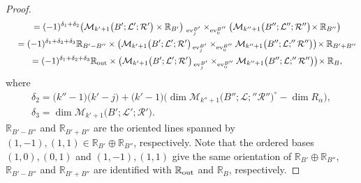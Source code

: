 \documentclass[pdftex]{sigma}
\numberwithin{equation}{section}
\theoremstyle{definition}
\begin{document}
\begin{proof}
\begin{gather}
\quad{} =  (-1)^{\delta_1 + \delta_2} \bigl( {\mathcal M}_{k'+1}\bigl(B';{\mathcal L}';{\mathcal R}'\bigr) \times {\mathbb R}_{B'} \bigr)
~_{{\rm ev}_j^{B'}} \times_{{\rm ev}_0^{B''}}
\bigl( {\mathcal M}_{k''+1}\bigl(B'';{\mathcal L}'';{\mathcal R}''\bigr)\! \times {\mathbb R}_{B''} \bigr) \nonumber \\
\quad{} =  (-1)^{\delta_1 + \delta_2 + \delta_3} {\mathbb R}_{B'-B''} \times \bigl( {\mathcal M}_{k'+1}\bigl(B';{\mathcal L}';{\mathcal R}'\bigr)\! ~_{{\rm ev}_j^{B'}} \times_{{\rm ev}_0^{B''}}
{\mathcal M}_{k''+1}\bigl(B'';{\mathcal L};''{\mathcal R}''\bigr) \bigr)
\! \times {\mathbb R}_{B'+B''} \nonumber \\
\quad{} =  (-1)^{\delta_1 + \delta_2 + \delta_3} {\mathbb R}_{\rm out} \times \bigl( {\mathcal M}_{k'+1}\bigl(B';{\mathcal L}';{\mathcal R}'\bigr)\! ~_{{\rm ev}_j^{B'}} \times_{{\rm ev}_0^{B''}}
{\mathcal M}_{k''+1}\bigl(B'';{\mathcal L};''{\mathcal R}''\bigr) \bigr)
\!  \times {\mathbb R}_{B}, \label{ori1}
\end{gather}
where
\begin{gather*}
\delta_2 =  \bigl(k''-1\bigr) \bigl(k' -j\bigr) + \bigl(k' -1\bigr) \bigl( \dim {\mathcal M}_{k''+1}\bigl(B'';{\mathcal L};''{\mathcal R}''\bigr)^{\circ} - \dim R_{\alpha} \bigr), \\
\delta_3 = \dim {\mathcal M}_{k'+1}\bigl(B';{\mathcal L}';{\mathcal R}'\bigr).
\end{gather*}
${\mathbb R}_{B'-B''}$ and ${\mathbb R}_{B'+B''}$ are the oriented lines spanned by $(1, -1), (1, 1) \in {\mathbb R}_{B'} \oplus {\mathbb R}_{B''}$, respectively.
Note that the ordered bases $(1,0), (0,1)$ and $(1, -1), (1,1)$ give the same orientation of ${\mathbb R}_{B'} \oplus {\mathbb R}_{B''}$,
${\mathbb R}_{B'-B''}$ and ${\mathbb R}_{B'+B''}$ are identified with ${\mathbb R}_{\rm out}$ and ${\mathbb R}_B$, respectively.


\end{proof}
\end{document}
